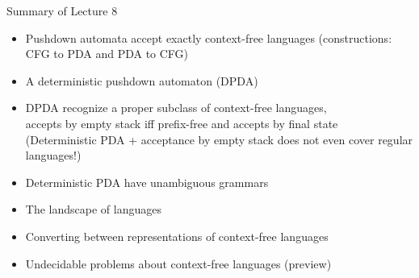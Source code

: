 \documentclass[handout]{beamer}
\begin{document}
\begin{frame}{Summary of Lecture 8}

    \begin{itemize}
        \item Pushdown automata accept exactly context-free languages (constructions: CFG to PDA and PDA to CFG)
        \item A deterministic pushdown automaton (DPDA)
        \item DPDA recognize a proper subclass of context-free languages,\\ accepts by empty stack iff prefix-free and accepts by final state\\
        (Deterministic PDA + acceptance by empty stack does not even cover regular languages!)
        \item Deterministic PDA have unambiguous grammars
        \item The landscape of languages
        \item Converting between representations of context-free languages
        \item Undecidable problems about context-free languages (preview)
	\end{itemize}

\end{frame}
\end{document}
